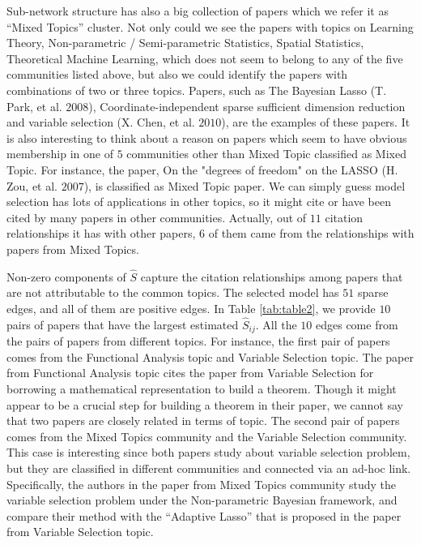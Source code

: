 \documentclass[AMS,STIX1COL]{WileyNJD-v2}
\begin{document}
{Sub-network structure has also a big collection of papers which we refer it as ``Mixed Topics'' cluster.
Not only could we see the papers with topics on Learning Theory, Non-parametric / Semi-parametric Statistics, Spatial Statistics, Theoretical Machine Learning, which does not seem to belong to any of the five communities listed above, but also we could identify the papers with combinations of two or three topics.
Papers, such as The Bayesian Lasso (T. Park, et al. $2008$), Coordinate-independent sparse sufficient dimension reduction and variable selection (X. Chen, et al. $2010$), are the examples of these papers.
It is also interesting to think about a reason on papers which seem to have obvious membership in one of $5$ communities other than Mixed Topic classified as Mixed Topic.
For instance, the paper, On the "degrees of freedom" on the LASSO (H. Zou, et al. $2007$), is classified as Mixed Topic paper.
We can simply guess model selection has lots of applications in other topics, so it might cite or have been cited by many papers in other communities.
Actually, out of $11$ citation relationships it has with other papers, $6$ of them came from the relationships with papers from Mixed Topics.

Non-zero components of $\widehat{S}$ capture the citation relationships among papers that are not attributable to the common topics.
The selected model has $51$ sparse edges, and all of them are positive edges.
In Table \ref{tab:table2}, we provide $10$ pairs of papers that have the largest estimated $\widehat{S}_{ij}$.
All the $10$ edges come from the pairs of papers from different topics.
For instance, the first pair of papers comes from the Functional Analysis topic and Variable Selection topic.
The paper from Functional Analysis topic cites the paper from Variable Selection for borrowing a mathematical representation to build a theorem.
Though it might appear to be a crucial step for building a theorem in their paper, we cannot say that two papers are closely related in terms of topic.
The second pair of papers comes from the Mixed Topics community and the Variable Selection community.
This case is interesting since both papers study about variable selection problem, but they are classified in different communities and connected via an ad-hoc link.
Specifically, the authors in the paper from Mixed Topics community study the variable selection problem under the Non-parametric Bayesian framework, and compare their method with the ``Adaptive Lasso'' that is proposed in the paper from Variable Selection topic.


}
\end{document}
